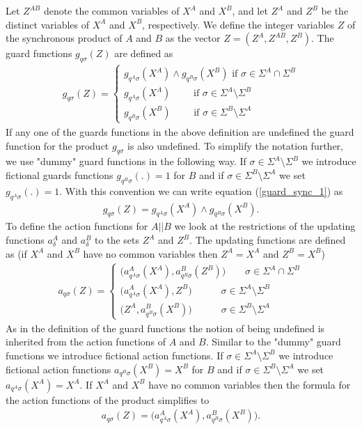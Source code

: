 \documentclass{article}
\begin{document}
 Let $Z^{AB}$ denote the common variables of $X^{A}$ and $X^{B}$, and let $Z^A$
and $Z^B$ be the distinct variables of $X^{A}$ and $X^{B}$,
respectively. We define the integer variables $Z$ of the
synchronous product of $A$ and $B$ as the vector $Z=(Z^A, Z^{AB},
Z^B)$. The guard functions $g_{q \sigma}(Z)$ are defined as
\begin{eqnarray}\label{guard_sync_1}
g_{q \sigma}(Z)=\left\{
\begin{array}{ll}
g_{q^A\sigma}(X^{A})\wedge g_{q^B\sigma}(X^{B}) \textrm{ if }\sigma\in \Sigma^A \cap \Sigma^B\\
g_{q^A\sigma}(X^{A}) \quad\quad \textrm{ if } \sigma\in \Sigma^A \setminus \Sigma^B\\
g_{q^B\sigma}(X^{B}) \quad\quad \textrm{ if }
\sigma\in\Sigma^B\setminus \Sigma^A
\end{array}\right.
\end{eqnarray}
If any one of the guards functions in the above definition are
undefined the guard function for the product $g_{q \sigma}$ is
also undefined. To simplify the notation further, we use "dummy"
guard functions in the following way. If $\sigma\in \Sigma^A
\setminus \Sigma^B$ we introduce fictional guards functions
$g_{q^B\sigma}(.)=1$ for $B$ and if $\sigma\in\Sigma^B\setminus
\Sigma^A$ we set $g_{q^A\sigma}(.)=1$. With this convention we can
write equation (\ref{guard_sync_1}) as
\begin{eqnarray}
g_{q \sigma}(Z)= g_{q^A\sigma}(X^{A})\wedge g_{q^B\sigma}(X^{B}).
\end{eqnarray}
To define the action functions for $A||B$ we look at the
restrictions of the updating functions $a^A_\delta$ and
$a^B_\delta$ to the sets $Z^A$ and $Z^B$. The updating functions
are defined as (if $X^{A}$ and $X^{B}$ have no common variables
then $Z^A=X^{A}$ and $Z^B=X^{B}$)
\begin{eqnarray}
a_{q \sigma}(Z)=\left\{
\begin{array}{ll}
 \big(a^A_{q^A \sigma}(X^{A}), a^B_{q^B \sigma}(Z^{B})\big)\quad\quad\sigma\in \Sigma^A \cap \Sigma^B\\
\big(a^A_{q^A \sigma}(X^{A}), Z^{B}\big)\quad\quad\quad\sigma\in \Sigma^A \setminus \Sigma^B\\
\big(Z^{A}, a^B_{q^B \sigma}(X^{B})\big)\quad\quad\quad\sigma\in
\Sigma^B \setminus \Sigma^A
\end{array}\right.
\end{eqnarray}
As in the definition of the guard functions the notion of being
undefined is inherited from the action functions of $A$ and $B$.
Similar to the "dummy" guard functions we introduce fictional
action functions. If $\sigma\in \Sigma^A \setminus \Sigma^B$ we
introduce fictional action functions $a_{q^B\sigma}(X^B)=X^B$ for
$B$ and if $\sigma\in\Sigma^B\setminus \Sigma^A$ we set
$a_{q^A\sigma}(X^A)=X^A$. If $X^{A}$ and $X^{B}$ have no common
variables then the formula for the action functions of the product
simplifies to
\begin{eqnarray}
a_{q \sigma}(Z)=
 \big(a^A_{q^A \sigma}(X^{A}), a^B_{q^B \sigma}(X^{B})\big).
\end{eqnarray}
\end{document}

